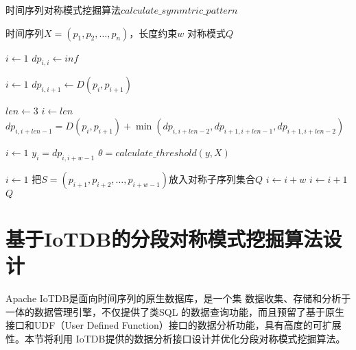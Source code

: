 \begin{algorithm}
  \caption{时间序列对称模式挖掘算法$calculate\_symmtric\_pattern$}
  \label{alg:symmetric_pattern}
  \small
  \begin{algorithmic}
    \REQUIRE 时间序列$X=\left(p_{1}, p_{2}, \dots, p_{n}\right)$，长度约束$w$
    \ENSURE 对称模式$Q$

    \STATE $i \leftarrow 1$
    \STATE $dp_{i,i} \leftarrow inf$
    \ENDWHILE

    \STATE $i \leftarrow 1$
    \STATE $dp_{i,i+1} \leftarrow D\left(p_{i}, p_{i+1}\right)$
    \ENDWHILE

    \STATE $len \leftarrow 3$
    \STATE $i \leftarrow len$
    \STATE $dp_{i,i+len-1} = D\left(p_{i}, p_{i+1}\right)+\min \left(dp_{i,i+len-2},dp_{i+1,i+len-1},dp_{i+1,i+len-2}\right)$
    \ENDWHILE
    \ENDWHILE

    \STATE $i \leftarrow 1$
    \STATE $y_i=dp_{i,i+w-1}$
    \ENDWHILE
    \STATE $\theta = calculate\_threshold\left(y,X\right)$

    \STATE $i \leftarrow 1$
    \STATE 把$S=\left(p_{i+1}, p_{i+2}, \dots, p_{i+w-1}\right)$放入对称子序列集合$Q$
    \STATE $i \leftarrow i+w$
    \ELSE
    \STATE $i \leftarrow i+1$
    \ENDIF
    \ENDWHILE
    \RETURN $Q$
  \end{algorithmic}
\end{algorithm}

\section{基于IoTDB的分段对称模式挖掘算法设计}

Apache IoTDB是面向时间序列的原生数据库，是一个集
数据收集、存储和分析于一体的数据管理引擎，不仅提供了类SQL
的数据查询功能，而且预留了基于原生接口和UDF（User Defined 
Function）接口的数据分析功能，具有高度的可扩展性。本节将利用
IoTDB提供的数据分析接口设计并优化分段对称模式挖掘算法。







